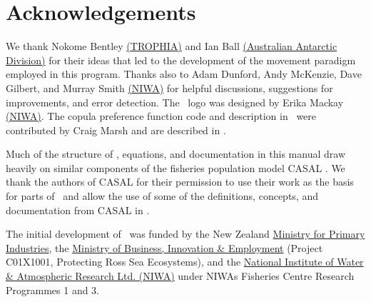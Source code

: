 \section{Acknowledgements\label{sec:acknowledgements}}

We thank Nokome Bentley \href{http://www.trophia.co.nz}{(TROPHIA)} and Ian Ball \href{http://www.aad.gov.au}{(Australian Antarctic Division)} for their ideas that led to the development of the movement paradigm employed in this program. Thanks also to Adam Dunford, Andy McKenzie, Dave Gilbert, and Murray Smith \href{http://www.niwa.co.nz}{(NIWA)} for helpful discussions, suggestions for improvements, and error detection. The \SPM\ logo was designed by Erika Mackay \href{http://www.niwa.co.nz}{(NIWA)}. The copula preference function code and description in \SPM\ were contributed by Craig Marsh and are described in \cite{Marsh2015}.

Much of the structure of \SPM, equations, and documentation in this manual draw heavily on similar components of the fisheries population model CASAL \citep{1388}. We thank the authors of CASAL for their permission to use their work as the basis for parts of \SPM\ and allow the use of some of the definitions, concepts, and documentation from CASAL in \SPM. 

The initial development of \SPM\ was funded by the New Zealand \href{http://www.mpi.govt.nz}{Ministry for Primary Industries}, the \href{http://www.msi.govt.nz}{Ministry of Business, Innovation \& Employment} (Project C01X1001, Protecting Ross Sea Ecosystems), and the \href{http://www.niwa.co.nz}{National Institute of Water \& Atmospheric Research Ltd. (NIWA)} under NIWAs Fisheries Centre Research Programmes 1 and 3. 

